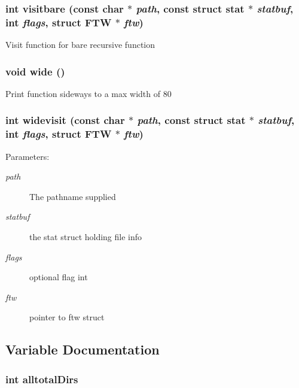 \subsubsection{\setlength{\rightskip}{0pt plus 5cm}int visitbare (const char $\ast$ {\em path}, const struct stat $\ast$ {\em statbuf}, int {\em flags}, struct FTW $\ast$ {\em ftw})}\label{dir_8c_22874809ed5faa8f2faa6185102b7803}


Visit function for bare recursive function 
\subsubsection{\setlength{\rightskip}{0pt plus 5cm}void wide ()}\label{dir_8c_296e4d798368b2136158a86aa0b74e4f}


Print function sideways to a max width of 80 
\subsubsection{\setlength{\rightskip}{0pt plus 5cm}int widevisit (const char $\ast$ {\em path}, const struct stat $\ast$ {\em statbuf}, int {\em flags}, struct FTW $\ast$ {\em ftw})}\label{dir_8c_3cd01b34455f6845ef6d047bd9810351}


\begin{Desc}
\item[Parameters:]
\begin{description}
\item[{\em path}]The pathname supplied \item[{\em statbuf}]the stat struct holding file info \item[{\em flags}]optional flag int \item[{\em ftw}]pointer to ftw struct \end{description}
\end{Desc}


\subsection{Variable Documentation}
\subsubsection{\setlength{\rightskip}{0pt plus 5cm}int {\bf alltotal\-Dirs}}\label{dir_8c_a587854f656c188d807e579f71bb72f3}


